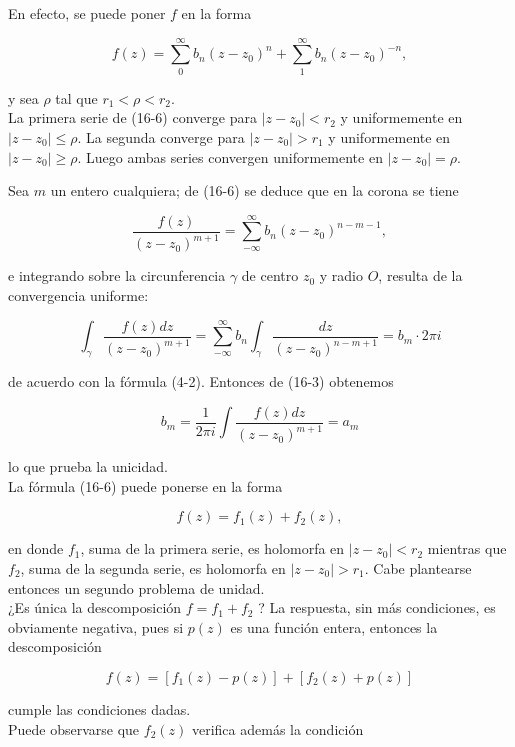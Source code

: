 \documentclass[10pt]{article}
\theoremstyle{plain}
\theoremstyle{definition}
\theoremstyle{remark}
\begin{document}
En efecto, se puede poner $f$ en la forma


\begin{equation*}
f(z)=\sum_{0}^{\infty} b_{n}\left(z-z_{0}\right)^{n}+\sum_{1}^{\infty} b_{n}\left(z-z_{0}\right)^{-n}, \tag{16-6}
\end{equation*}


y sea $\rho$ tal que $r_{1}<\rho<r_{2}$.\\
La primera serie de (16-6) converge para $\left|z-z_{0}\right|<r_{2}$ y uniformemente en $\left|z-z_{0}\right| \leqslant \rho$. La segunda converge para $\left|z-z_{0}\right|>r_{1}$ y uniformemente en $\left|z-z_{0}\right| \geqslant \rho$. Luego ambas series convergen uniformemente en $\left|z-z_{0}\right|=\rho$.

Sea $m$ un entero cualquiera; de (16-6) se deduce que en la corona se tiene

$$
\frac{f(z)}{\left(z-z_{0}\right)^{m+1}}=\sum_{-\infty}^{\infty} b_{n}\left(z-z_{0}\right)^{n-m-1},
$$

e integrando sobre la circunferencia $\gamma$ de centro $z_{0}$ y radio $O$, resulta de la convergencia uniforme:

$$
\int_{\gamma} \frac{f(z) d z}{\left(z-z_{0}\right)^{m+1}}=\sum_{-\infty}^{\infty} b_{n} \int_{\gamma} \frac{d z}{\left(z-z_{0}\right)^{n-m+1}}=b_{m} \cdot 2 \pi i
$$

de acuerdo con la fórmula (4-2). Entonces de (16-3) obtenemos

$$
b_{m}=\frac{1}{2 \pi i} \int \frac{f(z) d z}{\left(z-z_{0}\right)^{m+1}}=a_{m}
$$

lo que prueba la unicidad.\\
La fórmula (16-6) puede ponerse en la forma


\begin{equation*}
f(z)=f_{1}(z)+f_{2}(z), \tag{16.7}
\end{equation*}


en donde $f_{1}$, suma de la primera serie, es holomorfa en $\left|z-z_{0}\right|<r_{2}$ mientras que $f_{2}$, suma de la segunda serie, es holomorfa en $\left|z-z_{0}\right|>r_{1}$. Cabe plantearse entonces un segundo problema de unidad.\\
¿Es única la descomposición $f=f_{1}+f_{2}$ ? La respuesta, sin más condiciones, es obviamente negativa, pues si $p(z)$ es una función entera, entonces la descomposición

$$
f(z)=\left[f_{1}(z)-p(z)\right]+\left[f_{2}(z)+p(z)\right]
$$

cumple las condiciones dadas.\\
Puede observarse que $f_{2}(z)$ verifica además la condición
\end{document}
